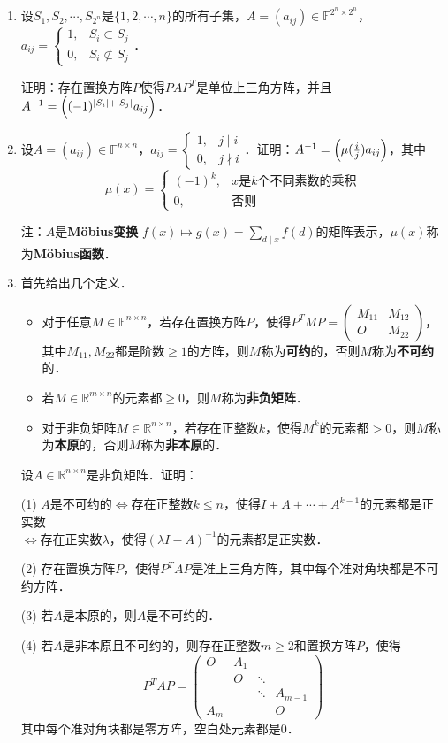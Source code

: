 \documentclass[a4paper,fontset=windows]{ctexbook}
\theoremstyle{definition}
\renewcommand{\le}{\leqslant}
\renewcommand{\ge}{\geqslant}
\begin{document}
\begin{enumerate}
\item 设$S_1,S_2,\cdots,S_{2^n}$是$\{1,2,\cdots,n\}$的所有子集，$A=(a_{ij})\in\mathbb{F}^{2^n\times 2^n}$，$a_{ij}=\begin{cases}1,&S_i\subset S_j \\ 0,&S_i\not\subset S_j\end{cases}$．

证明：存在置换方阵$P$使得$PAP^T$是单位上三角方阵，并且$A^{-1}=\Bigl((-1)^{|S_i|+|S_j|}a_{ij}\Bigr)$．

\item 设$A=(a_{ij})\in\mathbb{F}^{n\times n}$，$a_{ij}=\begin{cases}1,&j\mid i \\ 0,&j\nmid i\end{cases}$．证明：$A^{-1}=\Bigl(\mu(\tfrac{i}{j})a_{ij}\Bigr)$，其中
$$\mu(x)=\begin{cases}(-1)^k,&\text{$x$是$k$个不同素数的乘积} \\ 0,&\text{否则}\end{cases}$$

注：$A$是{\bf M\"obius变换} $f(x)\mapsto g(x)=\sum\limits_{d\mid x}f(d)$的矩阵表示，$\mu(x)$称为{\bf M\"obius函数}．

\item 首先给出几个定义．
\begin{itemize}
\item 对于任意$M\in\mathbb{F}^{n\times n}$，若存在置换方阵$P$，使得$P^TMP=\begin{pmatrix}M_{11}&M_{12} \\ O&M_{22}\end{pmatrix}$，其中$M_{11},M_{22}$都是阶数$\ge 1$的方阵，则$M$称为{\bf 可约}的，否则$M$称为{\bf 不可约}的．
\item 若$M\in\mathbb{R}^{m\times n}$的元素都$\ge 0$，则$M$称为{\bf 非负矩阵}．
\item 对于非负矩阵$M\in\mathbb{R}^{n\times n}$，若存在正整数$k$，使得$M^k$的元素都$>0$，则$M$称为{\bf 本原}的，否则$M$称为{\bf 非本原}的．
\end{itemize}

设$A\in\mathbb{R}^{n\times n}$是非负矩阵．证明：

(1) $A$是不可约的$\Leftrightarrow$存在正整数$k\le n$，使得$I+A+\cdots+A^{k-1}$的元素都是正实数 \\ \hspace*{85pt}$\Leftrightarrow$存在正实数$\lambda$，使得$(\lambda I-A)^{-1}$的元素都是正实数．

(2) 存在置换方阵$P$，使得$P^TAP$是准上三角方阵，其中每个准对角块都是不可约方阵．

(3) 若$A$是本原的，则$A$是不可约的．

(4) 若$A$是非本原且不可约的，则存在正整数$m\ge 2$和置换方阵$P$，使得
$$P^TAP=\begin{pmatrix}O&A_1&& \\ &O&\ddots& \\ &&\ddots&A_{m-1} \\ A_m&&&O\end{pmatrix}$$
其中每个准对角块都是零方阵，空白处元素都是0．

\end{enumerate}
\end{document}
